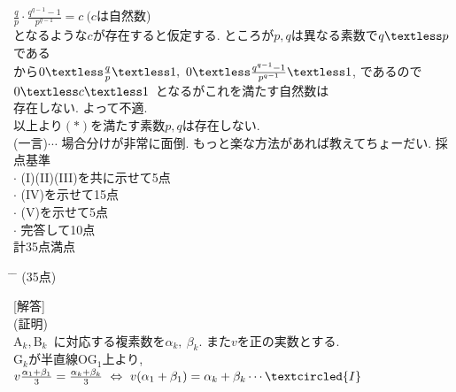 \documentclass{article}
\begin{document}
 $\frac{q}{p}\cdot \frac{q^{q-1}-1}{p^{q-1}}=c\ (c$は自然数)\vspace{0.1in}\\
 となるような$c$が存在すると仮定する. ところが$p,q$は異なる素数で$q\textless p$である\vspace{0.1in}\\
 から$0\textless \frac{q}{p}\textless 1,\ 0\textless \frac{q^{q-1}-1}{p^{q-1}}\textless 1$, であるので$0\textless c\textless1$ となるがこれを満たす自然数は\vspace{0.1in}\\
 存在しない. よって不適.\vspace{0.2in}\\
 以上より$(\ast)$を満たす素数$p,q$は存在しない.\vspace{0.1in}\\
 (一言)$\cdots$ 場合分けが非常に面倒. もっと楽な方法があれば教えてちょーだい.
 \newpage
 {\Large 採点基準}\vspace{0.1in}\\
 $\cdot$ (I)(II)(III)を共に示せて5点\vspace{0.2in}\\
 $\cdot$ (IV)を示せて15点\vspace{0.2in}\\
 $\cdot$ (V)を示せて5点\vspace{0.2in}\\
 $\cdot$ 完答して10点\vspace{0.2in}\\
 計35点満点\vspace{0.2in}\\
\newpage
\begin{tabbing}
\hspace{0.91\textwidth} \= \hspace{0.8\textwidth} \= \kill
\textsf{}\> (35点)\>\\
\end{tabbing}
[{\large 解答}]\vspace{0.1in}\\
(証明)\vspace{0.1in}\\
A$_k,$B$_k$ に対応する複素数を$\alpha_k,\ \beta_k.$ また$v$を正の実数とする. \vspace{0.1in}\\
G$_k$が半直線OG$_1$上より,\vspace{0.1in}\\
$v\frac{\alpha_1+\beta_1}{3}=\frac{\alpha_k+\beta_k}{3}\ \Leftrightarrow\ v(\alpha_1+\beta_1)=\alpha_k+\beta_k\cdots \textcircled{I}$\vspace{0.1in}\\
\end{document}

